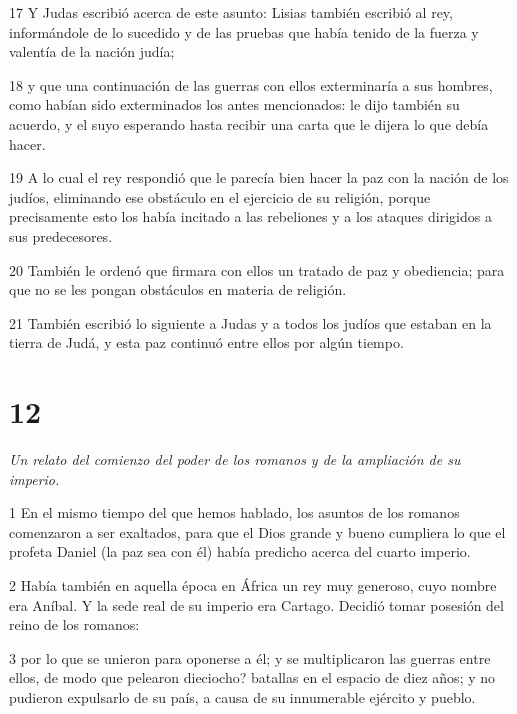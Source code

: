 \par 17 Y Judas escribió acerca de este asunto: Lisias también escribió al rey, informándole de lo sucedido y de las pruebas que había tenido de la fuerza y ​​valentía de la nación judía;

\par 18 y que una continuación de las guerras con ellos exterminaría a sus hombres, como habían sido exterminados los antes mencionados: le dijo también su acuerdo, y el suyo esperando hasta recibir una carta que le dijera lo que debía hacer.

\par 19 A lo cual el rey respondió que le parecía bien hacer la paz con la nación de los judíos, eliminando ese obstáculo en el ejercicio de su religión, porque precisamente esto los había incitado a las rebeliones y a los ataques dirigidos a sus predecesores.

\par 20 También le ordenó que firmara con ellos un tratado de paz y obediencia; para que no se les pongan obstáculos en materia de religión.

\par 21 También escribió lo siguiente a Judas y a todos los judíos que estaban en la tierra de Judá, y esta paz continuó entre ellos por algún tiempo.


\chapter{12}

\par \textit{Un relato del comienzo del poder de los romanos y de la ampliación de su imperio.}

\par 1 En el mismo tiempo del que hemos hablado, los asuntos de los romanos comenzaron a ser exaltados, para que el Dios grande y bueno cumpliera lo que el profeta Daniel (la paz sea con él) había predicho acerca del cuarto imperio.

\par 2 Había también en aquella época en África un rey muy generoso, cuyo nombre era Aníbal. Y la sede real de su imperio era Cartago. Decidió tomar posesión del reino de los romanos:

\par 3 por lo que se unieron para oponerse a él; y se multiplicaron las guerras entre ellos, de modo que pelearon dieciocho? batallas en el espacio de diez años; y no pudieron expulsarlo de su país, a causa de su innumerable ejército y pueblo.

